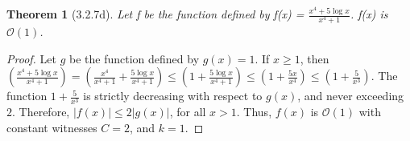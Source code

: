 \documentclass[a4paper, 12pt]{article}
\theoremstyle{plain}
\newtheorem*{theorem*}{Theorem}
\begin{document}
	
	\begin{theorem*}[3.2.7d]
		Let f be the function defined by f(x) = $\frac{x^{4} + 5 \log x}{x^{4} + 1}$. \newline f(x) is $\mathcal{O}(1)$.
	\end{theorem*}
	
	\begin{proof}
		Let $g$ be the function defined by $g(x) = 1$. If $x \ge 1$, then \newline \newline \indent
		$\left( \frac{x^{4} + 5 \log x}{x^{4} + 1} \right) = \left( \frac{x^{4}}{x^{4} + 1} + \frac{5 \log x}{x^{4} + 1} \right) \le \left( 1 + \frac{5 \log x}{x^{4} + 1} \right) \le \left( 1 + \frac{5x}{x^{4}} \right) \le \left( 1 + \frac{5}{x^{3}} \right)$. \newline \newline The function $1 + \frac{5}{x^{3}}$ is strictly decreasing with respect to $g(x)$, and never exceeding $2$. Therefore, $|f(x)| \le 2|g(x)|$, for all $x > 1$. Thus, $f(x)$ is $\mathcal{O}(1)$ with constant witnesses $C = 2$, and $k = 1$.
	\end{proof}
\end{document}
